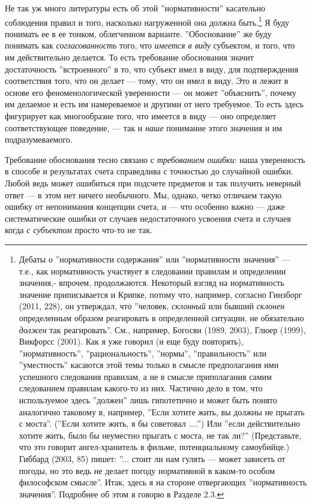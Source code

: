 \documentclass[12pt]{book}
\begin{document}
Не так уж много литературы есть об этой ''нормативности'' касательно соблюдения правил и того, насколько нагруженной она должна быть.\footnote{Дебаты о ''нормативности содержания'' или ''нормативности значения'' --- т.е., как нормативность участвует в следовании правилам и определении значения,- впрочем, продолжаются. Некоторый взгляд на нормативность значение приписывается и Крипке, потому что, например, согласно Гинзборг (2011, 228), он утверждал, что ''человек, \textit{склонный} или бывший \textit{склонен} определенным образом реагировать в определенной ситуации, не обязательно \textit{должен} так реагировать''. См., например, Богосян (1989, 2003), Глюер (1999), Викфорсс (2001). Как я уже говорил (и еще буду повторять), ''нормативность'', ''рациональность'', ''нормы'', ''правильность'' или ''уместность'' касаются этой темы только в смысле предполагания ими успешного следования правилам, а не в смысле приполагания самим следованием правилам какого-то из них. Частично дело в том, что используемое здесь ''должен'' лишь гипотетично и может быть понято аналогично таковому в, например, ''Если хотите жить, вы должны не прыгать с моста''. (''Если хотите жить, я бы советовал ....'') Или ''если действительно хотите жить, было бы неуместно прыгать с моста, не так ли?'' (Представьте, что это говорит ангел-хранитель в фильме, потенциальному самоубийце.) Гиббард (2003, 85) пишет: ''... стоит ли нам гулять --- может зависеть от погоды, но это ведь не делает погоду нормативной в каком-то особом философском смысле''. Итак, здесь я на стороне отвергающих ''нормативность значения''. Подробнее об этом я говорю в Разделе 2.3.} Я буду понимать ее в ее тонком, облегченном варианте. ''Обоснование'' же буду понимать как \textit{согласованность} того, что \textit{имеется в виду} субъектом, и того, что им действительно делается. То есть требование обоснования значит достаточность ''встроенного'' в то, что субъект имел в виду, для подтверждения соответствия того, что он делает --- тому, что он имел в виду. Это и лежит в основе его феноменологической уверенности --- он может ''объяснить'', почему им делаемое и есть им намереваемое и другими от него требуемое. То есть здесь фигурирует как многообразие того, что имеется в виду --- оно определяет соответствующее поведение, --- так и \textit{наше} понимание этого значения и им подразумеваемого.

Требование обоснования тесно связано с \textit{требованием ошибки}: наша уверенность в способе и результатах счета справедлива с точностью до случайной ошибки. Любой ведь может ошибиться при подсчете предметов и так получить неверный ответ --- в этом нет ничего необычного. Мы, однако, четко отличаем такую ошибку от непонимания концепции счета, и --- что особенно важно --- даже систематические ошибки от случаев недостаточного усвоения счета и случаев когда \textit{с субъектом} просто что-то не так.
\end{document}
